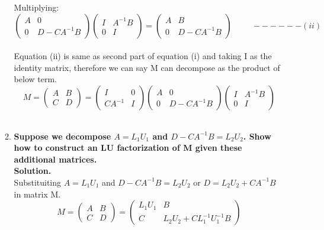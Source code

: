 \documentclass[12pt, oneside]{article}   	%
\begin{document}
\begin{enumerate}
\begin{enumerate}
Multiplying: 
$$
\left(\begin{array}{cc} A & 0\\ 0& D-CA^{-1}B \end{array}\right)
\left(\begin{array}{cc} I & A^{-1}B \\0& I \end{array}\right)=\left(\begin{array}{cc}A & B\\ 0& D-CA^{-1}B \end{array}\right)
\hspace{1cm}------(ii)
$$ \\
Equation (ii) is same as second part of equation (i) and taking I as the identity matrix, therefore we can say M can decompose as the product of below term. \\
$$
M=\begin{pmatrix}
A& B\\
C & D
\end{pmatrix}
=\left(\begin{array}{cc} I & 0\\ CA^{-1} & I \end{array}\right)
\left(\begin{array}{cc} A & 0\\ 0& D-CA^{-1}B \end{array}\right)
\left(\begin{array}{cc} I & A^{-1}B \\0& I \end{array}\right)
$$\\

 
	\item \textbf{Suppose we decompose $ A= L
	_1 U_1$ and $D-CA^{-1}B = L_2U_2$.  Show how to construct an LU factorization of M given these additional matrices.}\\

\textbf{Solution.}\\

Substituiting $ A= L
_1 U_1$ and $D-CA^{-1}B = L_2U_2$ or  $D = L_2U_2+CA^{-1}B$ in  matrix M. \\
$$
M=\begin{pmatrix}
A& B\\
C & D
\end{pmatrix}
=\begin{pmatrix}
	L_1U_1& B\\
	C & L_2U_2+CL_1^{-1}U_1^{-1}B
\end{pmatrix}
$$\\


\end{enumerate}
\end{enumerate}
\end{document}

